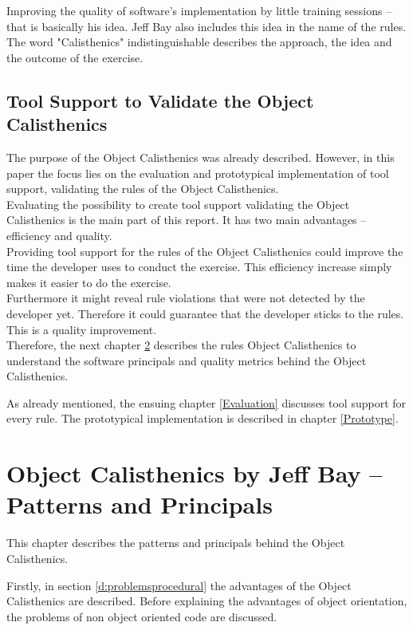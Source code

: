 Improving the quality of software's implementation by little training sessions -- that is basically his idea. Jeff Bay also includes this idea in the name of the rules. The word "Calisthenics" indistinguishable describes the approach, the idea and the outcome of the exercise.\\

\section{Tool Support to Validate the Object Calisthenics}
The purpose of the Object Calisthenics was already described. However, in this paper the focus lies on the evaluation and prototypical implementation of tool support, validating the rules of the Object Calisthenics. \\

Evaluating the possibility to create tool support validating the Object Calisthenics is the main part of this report. It has two main advantages -- efficiency and quality.\\

Providing tool support for the rules of the Object Calisthenics could improve the time the developer uses to conduct the exercise. This efficiency increase simply makes it easier to do the exercise.\\

Furthermore it might reveal rule violations that were not detected by the developer yet. Therefore it could guarantee that the developer sticks to the rules. This is a quality improvement. \\

Therefore, the next chapter  \ref{Description} describes the rules Object Calisthenics to understand the software principals and quality metrics behind the Object Calisthenics. 

As already mentioned, the ensuing chapter \ref{Evaluation} discusses tool support for every rule.  The prototypical implementation is described in chapter \ref{Prototype}.

\chapter{Object Calisthenics by Jeff Bay -- Patterns and Principals}
\label{Description}
This chapter describes the patterns and principals behind the Object Calisthenics. 

Firstly, in section \ref{d:problemsprocedural} the advantages of the Object Calisthenics are described. Before explaining the advantages of object orientation, the problems of non object oriented code are discussed. 

